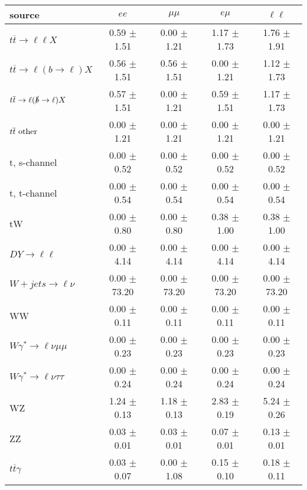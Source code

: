 \begin{tabular}{l|cccc} \hline\hline
source & $ee$ & $\mu\mu$ & $e\mu$ & $\ell\ell $ \\
\hline
$t\overline{t} \rightarrow \ell \ell X$ &  0.59 $\pm$  1.51 &  0.00 $\pm$  1.21 &  1.17 $\pm$  1.73 &  1.76 $\pm$  1.91 \\
$t\overline{t} \rightarrow \ell (b \rightarrow \ell) X$ &  0.56 $\pm$  1.51 &  0.56 $\pm$  1.51 &  0.00 $\pm$  1.21 &  1.12 $\pm$  1.73 \\
$t\overline{t} \rightarrow \ell (\slashed b \rightarrow \ell) X$ &  0.57 $\pm$  1.51 &  0.00 $\pm$  1.21 &  0.59 $\pm$  1.51 &  1.17 $\pm$  1.73 \\
        $t\overline{t}\ \rm{other}$ &  0.00 $\pm$  1.21 &  0.00 $\pm$  1.21 &  0.00 $\pm$  1.21 &  0.00 $\pm$  1.21 \\
\hline
                       t, s-channel &  0.00 $\pm$  0.52 &  0.00 $\pm$  0.52 &  0.00 $\pm$  0.52 &  0.00 $\pm$  0.52 \\
                       t, t-channel &  0.00 $\pm$  0.54 &  0.00 $\pm$  0.54 &  0.00 $\pm$  0.54 &  0.00 $\pm$  0.54 \\
                                 tW &  0.00 $\pm$  0.80 &  0.00 $\pm$  0.80 &  0.38 $\pm$  1.00 &  0.38 $\pm$  1.00 \\
\hline
         $DY \rightarrow \ell \ell$ &  0.00 $\pm$  4.14 &  0.00 $\pm$  4.14 &  0.00 $\pm$  4.14 &  0.00 $\pm$  4.14 \\
      $W+jets \rightarrow \ell \nu$ &  0.00 $\pm$ 73.20 &  0.00 $\pm$ 73.20 &  0.00 $\pm$ 73.20 &  0.00 $\pm$ 73.20 \\
                                 WW &  0.00 $\pm$  0.11 &  0.00 $\pm$  0.11 &  0.00 $\pm$  0.11 &  0.00 $\pm$  0.11 \\
\hline
$W\gamma^{*} \rightarrow \ell \nu \mu\mu$ &  0.00 $\pm$  0.23 &  0.00 $\pm$  0.23 &  0.00 $\pm$  0.23 &  0.00 $\pm$  0.23 \\
$W\gamma^{*} \rightarrow \ell \nu \tau\tau$ &  0.00 $\pm$  0.24 &  0.00 $\pm$  0.24 &  0.00 $\pm$  0.24 &  0.00 $\pm$  0.24 \\
                                 WZ &  1.24 $\pm$  0.13 &  1.18 $\pm$  0.13 &  2.83 $\pm$  0.19 &  5.24 $\pm$  0.26 \\
                                 ZZ &  0.03 $\pm$  0.01 &  0.03 $\pm$  0.01 &  0.07 $\pm$  0.01 &  0.13 $\pm$  0.01 \\
\hline
              $t\overline{t}\gamma$ &  0.03 $\pm$  0.07 &  0.00 $\pm$  1.08 &  0.15 $\pm$  0.10 &  0.18 $\pm$  0.11 \\

\end{tabular}
